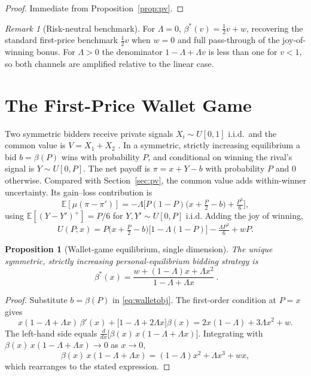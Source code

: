 \documentclass[11pt,a4paper]{article}
\newtheorem{proposition}{Proposition}
\theoremstyle{remark}
\newtheorem{remark}{Remark}
\begin{document}
\begin{proof}
Immediate from Proposition~\ref{prop:pv}.
\end{proof}
\begin{remark}[Risk-neutral benchmark]
For $\Lambda=0$, $\beta^{*}(v)=\tfrac12 v+w$, recovering the standard first-price
benchmark $\tfrac12 v$ when $w=0$ and full pass-through of the joy-of-winning bonus.
For $\Lambda>0$ the denominator $1-\Lambda+\Lambda v$ is less than one for $v<1$, so
both channels are amplified relative to the linear case.
\end{remark}
\section{The First-Price Wallet Game}
\label{sec:wallet}
Two symmetric bidders receive private signals $X_i\sim U[0,1]$ i.i.d.\ and the
common value is $V=X_1+X_2$ \citep{klemperer1998,milgromWeber1982}. In a symmetric,
strictly increasing equilibrium a bid $b=\beta(P)$ wins with probability $P$, and
conditional on winning the rival's signal is $Y\sim U[0,P]$. The net payoff is
$\pi=x+Y-b$ with probability $P$ and $0$ otherwise. Compared with
Section~\ref{sec:pv}, the common value adds within-winner uncertainty. Its
gain--loss contribution is
\begin{equation}
\mathbb{E}[\mu(\pi-\pi')]=-\Lambda\Big[P(1-P)\Big(x+\tfrac{P}{2}-b\Big)+\tfrac{P^{3}}{6}\Big],
\end{equation}
using $\mathbb{E}[(Y-Y')^{+}]=P/6$ for $Y,Y'\sim U[0,P]$ i.i.d. Adding the joy of
winning,
\begin{equation}
U(P;x)=P\Big(x+\tfrac{P}{2}-b\Big)\big[1-\Lambda(1-P)\big]-\tfrac{\Lambda P^{3}}{6}+wP .
\label{eq:walletobj}
\end{equation}
\begin{proposition}[Wallet-game equilibrium, single dimension]
\label{prop:wallet}
The unique symmetric, strictly increasing personal-equilibrium bidding strategy is
\begin{equation}
\boxed{\ \beta^{*}(x)=\frac{w+(1-\Lambda)x+\Lambda x^{2}}{1-\Lambda+\Lambda x}\ }.
\end{equation}
\end{proposition}
\begin{proof}
Substitute $b=\beta(P)$ in \eqref{eq:walletobj}. The first-order condition at $P=x$
gives
\begin{equation}
x(1-\Lambda+\Lambda x)\,\beta'(x)+\big[1-\Lambda+2\Lambda x\big]\beta(x)
=2x(1-\Lambda)+3\Lambda x^{2}+w .
\end{equation}
The left-hand side equals
$\frac{d}{dx}\big[\beta(x)\,x(1-\Lambda+\Lambda x)\big]$. Integrating with
$\beta(x)\,x(1-\Lambda+\Lambda x)\to0$ as $x\to0$,
\begin{equation}
\beta(x)\,x(1-\Lambda+\Lambda x)=(1-\Lambda)x^{2}+\Lambda x^{3}+wx,
\end{equation}
which rearranges to the stated expression.
\end{proof}
\end{document}
